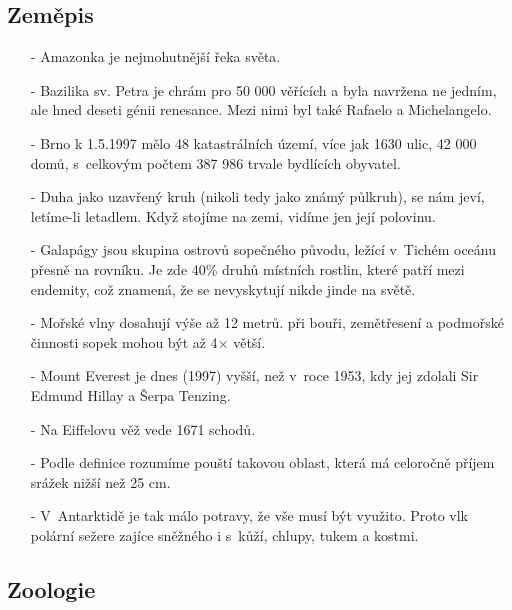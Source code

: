 \begin{multicols}{2}
\begin{itemize}
\end{itemize}

\subsection{Zeměpis}

\begin{itemize}
\itemsep -3pt

\item[-] Amazonka je nejmohutnější řeka světa.

\item[-] Bazilika sv. Petra je chrám pro 50 000 věřících a byla navržena 
ne jedním, ale hned deseti génii renesance. Mezi nimi byl také 
Rafaelo a Michelangelo.

\item[-] Brno k 1.5.1997 mělo 48 katastrálních území, více jak 1630 ulic, 
42 000 domů, s~celkovým počtem 387 986 trvale bydlících 
obyvatel.

\item[-] Duha jako uzavřený kruh (nikoli tedy jako známý půlkruh), se 
nám jeví, letíme-li letadlem. Když stojíme na zemi, vidíme 
jen její polovinu.

\item[-] Galapágy jsou skupina ostrovů sopečného původu, ležící v~Tichém 
oceánu přesně na rovníku. Je zde 40\% druhů místních rostlin, 
které patří mezi endemity, což znamená, že se nevyskytují nikde 
jinde na světě.

\item[-] Mořské vlny dosahují výše až 12 metrů. při bouři, zemětřesení 
a podmořské činnosti sopek mohou být až 4$\times$ větší.

\item[-] Mount Everest je dnes (1997) vyšší, než v~roce 1953, 
kdy jej zdolali Sir Edmund Hillay a Šerpa Tenzing.

\item[-] Na Eiffelovu věž vede 1671 schodů.

\item[-] Podle definice rozumíme pouští takovou oblast, která má celoročně 
příjem srážek nižší než 25 cm.

\item[-] V~Antarktidě je tak málo potravy, že vše musí být využito. 
Proto vlk polární sežere zajíce sněžného i s~kůží, chlupy, 
tukem a kostmi.

\end{itemize}

\subsection{Zoologie}


\end{multicols}
